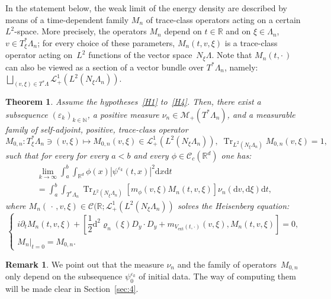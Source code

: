 \documentclass[10pt]{amsart}
\newtheorem{theo}[cdrthm]{Theorem}
\theoremstyle{definition}
\newtheorem{rema}[cdrthm]{Remark}
\DeclareMathOperator{\ext}{ext}
\DeclareMathOperator{\Trr}{Tr}
\newcommand*\R{{\mathbb R}}
\newcommand*\N{{\mathbb N}}
\newcommand*\eps{\varepsilon}
\newcommand*\Tr{\Trr}
\numberwithin{equation}{section}
\newcommand*{\dd}{\mathrm{d}}
\newcommand*{\dt}{\dd t}
\newcommand*{\dx}{\dd x}
\newcommand*{\dv}{\dd v}
\newcommand*{\dxi}{\dd \xi}
\begin{document}

In the statement below, the weak limit of the energy density are described by means of a time-dependent family $M_n$ of trace-class operators acting on a certain $L^2$-space. More precisely, the operators $M_n$ depend on $t\in\R$ and on $\xi\in\Lambda_n$, $v\in T^*_\xi\Lambda_n$; for every choice of these parameters, $M_n(t,v,\xi)$ is a trace-class operator acting on~$L^2$ functions of the vector space~$N_\xi\Lambda$. Note that $M_n(t,\cdot\,)$ can also be viewed as a section of a vector bundle over $T^*\Lambda_n$, namely: $\bigsqcup_{(v,\xi)\in T^*\Lambda}{\mathcal L}^1_+\left(L^2(N_\xi\Lambda_n)\right)$.




\begin{theo}\label{mainresult}
Assume the hypotheses~\eqref{H1} to~\eqref{H4}. Then, there exist a subsequence $(\eps_k)_{k\in\N}$, a positive measure $\nu_n\in\mathcal{M}_+(T^*\Lambda_n)$, and a measurable family of self-adjoint, positive, trace-class operator
\[
M_{0,n}:T^*_\xi\Lambda_n\ni (v,\xi)\longmapsto M_{0,n}(v,\xi)\in \mathcal{L}_+^1(L^2(N_\xi\Lambda_n)),\; \Tr_{L^2(N_\xi\Lambda_n)} M_{0,n}(v,\xi)=1,
\]
such that for every for every $a<b$ and every $\phi\in \mathcal{C}_c(\R^d)$ one has:
\begin{multline*}
\lim_{k\to\infty}\int_a^b\int_{\R^d}\phi(x)|\psi^{\eps_k}(t,x)|^2\dx\dt\\
=\int_a^b \int_{T^*\Lambda_n}\Tr_{L^2(N_\xi\Lambda_n)}\left[m_\phi(v,\xi)M_n(t,v,\xi)\right]\nu_n(\dv,\dxi)\dt,
\end{multline*}
where $M_n(\,\cdot\,, v,\xi)\in \mathcal{C}(\R;\mathcal{L}_+^1(L^2(N_\xi\Lambda_n))$ solves the Heisenberg equation:
\begin{equation}\label{eq:heis}
\begin{cases}
i\partial_t M_n(t,v,\xi) +\left[\dfrac{1}{2} \dd^2\varrho_n(\xi)D_y\cdot D_y + m_{V_{\ext}(t,\cdot)}(v,\xi), M_n(t,v,\xi)\right] =0,\\
M_n |_{t=0}=M_{0,n}.
\end{cases}
\end{equation}
\end{theo}


\begin{rema}
We point out that the measure $\nu_n$ and the family of operators~$M_{0,n}$ only depend on the subsequence $\psi^{\eps_k}_0$ of initial data. The way of computing them will be made clear in Section~\ref{sec:4}.
\end{rema}
\end{document}
